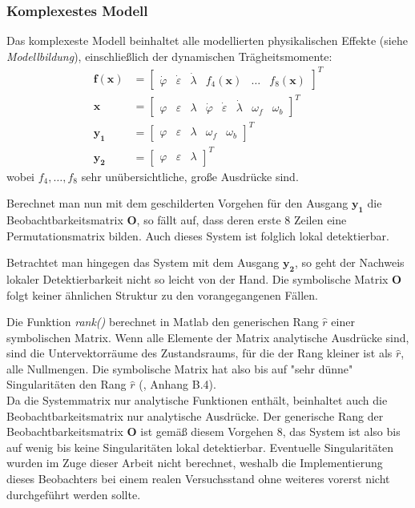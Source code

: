 \documentclass[times, 9pt,twocolumn]{article}
\begin{document}
	\subsubsection{Komplexestes Modell}
	Das komplexeste Modell beinhaltet alle modellierten physikalischen Effekte (siehe \textit{Modellbildung}), einschließlich der dynamischen Trägheitsmomente:
	\begin{align*}
	\bm f(\bm x) &= \begin{bmatrix}
	\dot \varphi &
	\dot \varepsilon &
	\dot \lambda  &
	f_4(\bm x) &
	\ldots &
	f_8(\bm x)
	\end{bmatrix}^T\\
	\bm x &= \begin{bmatrix}
	\varphi & \varepsilon & \lambda & \dot \varphi & \dot \varepsilon & \dot \lambda & \omega_f & \omega_b
	\end{bmatrix}^T \\ 
	\bm {y_1} &= \begin{bmatrix}
	\varphi & \varepsilon & \lambda & \omega_f & \omega_b
	\end{bmatrix}^T \\
	\bm {y_2} &= \begin{bmatrix}
	\varphi & \varepsilon & \lambda 
	\end{bmatrix}^T
\end{align*}
	wobei $f_4, \ldots, f_8$ sehr unübersichtliche, große Ausdrücke sind.

	Berechnet man nun mit dem geschilderten Vorgehen für den Ausgang $\bm{y_1}$
	die Beobachtbarkeitsmatrix $\bm O$, so fällt auf, dass deren erste 8 Zeilen eine Permutationsmatrix bilden.
	Auch dieses System ist folglich lokal detektierbar.

	Betrachtet man hingegen das System mit dem Ausgang $\bm{y_2}$, so geht der Nachweis lokaler Detektierbarkeit nicht so leicht von der Hand. 
	Die symbolische Matrix $\bm O$ folgt keiner ähnlichen Struktur zu den vorangegangenen Fällen.

	Die Funktion \textit{rank()} berechnet in Matlab den generischen Rang $\hat r$ einer symbolischen Matrix. Wenn alle Elemente der Matrix analytische Ausdrücke sind, sind die Untervektorräume des Zustandsraums, für die der Rang kleiner ist als $\hat r$, alle Nullmengen. Die symbolische Matrix hat also bis auf "sehr dünne" Singularitäten den Rang $\hat r$ (\cite{ex3}, Anhang B.4). \\
	Da die Systemmatrix nur analytische Funktionen enthält, beinhaltet auch die Beobachtbarkeitsmatrix nur analytische Ausdrücke. 
	Der generische Rang der Beobachtbarkeitsmatrix $\bm O$ ist gemäß diesem Vorgehen 8, das System ist also bis auf wenig bis keine Singularitäten lokal detektierbar. Eventuelle Singularitäten wurden im Zuge dieser Arbeit nicht berechnet, weshalb die Implementierung dieses Beobachters bei einem realen Versuchsstand ohne weiteres vorerst nicht durchgeführt werden sollte.
	
\end{document}
